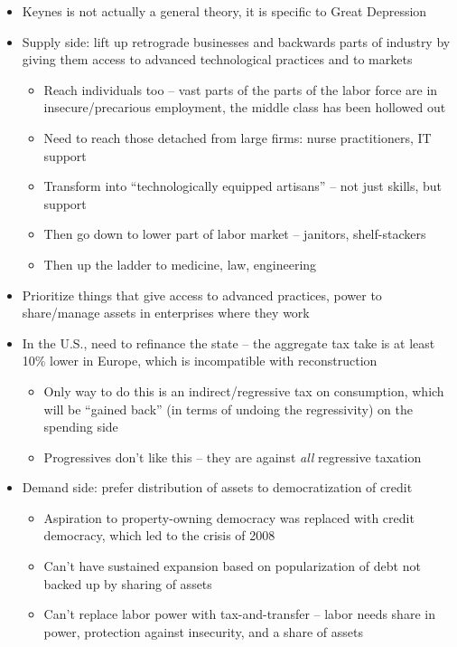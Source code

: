 \begin{enumerate}
  \begin{itemize}
  \tightlist
  \item
    Keynes is not actually a general theory, it is specific to Great
    Depression
  \item
    Supply side: lift up retrograde businesses and backwards parts of
    industry by giving them access to advanced technological practices
    and to markets

    \begin{itemize}
    \tightlist
    \item
      Reach individuals too -- vast parts of the parts of the labor
      force are in insecure/precarious employment, the middle class has
      been hollowed out
    \item
      Need to reach those detached from large firms: nurse
      practitioners, IT support
    \item
      Transform into ``technologically equipped artisans'' -- not just
      skills, but support
    \item
      Then go down to lower part of labor market -- janitors,
      shelf-stackers
    \item
      Then up the ladder to medicine, law, engineering
    \end{itemize}
  \item
    Prioritize things that give access to advanced practices, power to
    share/manage assets in enterprises where they work
  \item
    In the U.S., need to refinance the state -- the aggregate tax take
    is at least 10\% lower in Europe, which is incompatible with
    reconstruction

    \begin{itemize}
    \tightlist
    \item
      Only way to do this is an indirect/regressive tax on consumption,
      which will be ``gained back'' (in terms of undoing the
      regressivity) on the spending side
    \item
      Progressives don't like this -- they are against \emph{all}
      regressive taxation
    \end{itemize}
  \item
    Demand side: prefer distribution of assets to democratization of
    credit

    \begin{itemize}
    \tightlist
    \item
      Aspiration to property-owning democracy was replaced with credit
      democracy, which led to the crisis of 2008
    \item
      Can't have sustained expansion based on popularization of debt not
      backed up by sharing of assets
    \item
      Can't replace labor power with tax-and-transfer -- labor needs
      share in power, protection against insecurity, and a share of
      assets
    \end{itemize}
  \end{itemize}
\end{enumerate}

